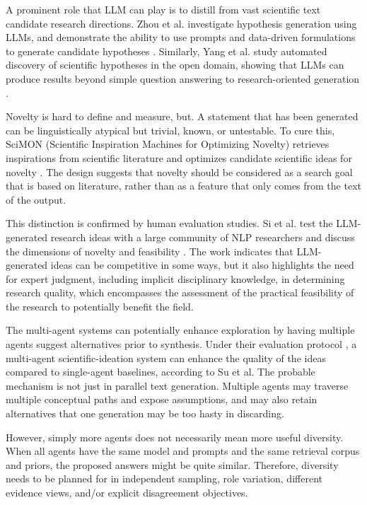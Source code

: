\documentclass[acmsmall,screen,review]{acmart}
\begin{document}
A prominent role that LLM can play is to distill from vast scientific text candidate research directions. Zhou et al. investigate hypothesis generation using LLMs, and demonstrate the ability to use prompts and data-driven formulations to generate candidate hypotheses \cite{zhou2024hypothesis}. Similarly, Yang et al. study automated discovery of scientific hypotheses in the open domain, showing that LLMs can produce results beyond simple question answering to research-oriented generation \cite{yang2024large}.

Novelty is hard to define and measure, but. A statement that has been generated can be linguistically atypical but trivial, known, or untestable. To cure this, SciMON (Scientific Inspiration Machines for Optimizing Novelty) retrieves inspirations from scientific literature and optimizes candidate scientific ideas for novelty \cite{wang2024scimon}. The design suggests that novelty should be considered as a search goal that is based on literature, rather than as a feature that only comes from the text of the output.

This distinction is confirmed by human evaluation studies. Si et al. test the LLM-generated research ideas with a large community of NLP researchers and discuss the dimensions of novelty and feasibility \cite{si2025novel}. The work indicates that LLM-generated ideas can be competitive in some ways, but it also highlights the need for expert judgment, including implicit disciplinary knowledge, in determining research quality, which encompasses the assessment of the practical feasibility of the research to potentially benefit the field.

The multi-agent systems can potentially enhance exploration by having multiple agents suggest alternatives prior to synthesis. Under their evaluation protocol \cite{su2025many}, a multi-agent scientific-ideation system can enhance the quality of the ideas compared to single-agent baselines, according to Su et al. The probable mechanism is not just in parallel text generation. Multiple agents may traverse multiple conceptual paths and expose assumptions, and may also retain alternatives that one generation may be too hasty in discarding.

However, simply more agents does not necessarily mean more useful diversity. When all agents have the same model and prompts and the same retrieval corpus and priors, the proposed answers might be quite similar. Therefore, diversity needs to be planned for in independent sampling, role variation, different evidence views, and/or explicit disagreement objectives.
\end{document}
